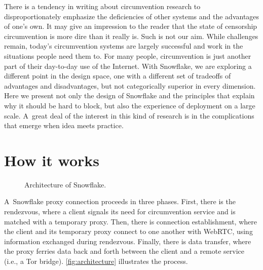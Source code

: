\documentclass[letterpaper,twocolumn]{article}
\begin{document}

There is a tendency in writing about
circumvention research to disproportionately emphasize
the deficiencies of other systems
and the advantages of one's own.
It may give an impression to the reader
that the state of censorship circumvention
is more dire than it really is.
Such is not our aim.
While challenges remain,
today's circumvention systems are largely successful
and work in the situations people need them to.
For many people, circumvention is just another part of their
day-to-day use of the Internet.
With Snowflake, we are exploring a different point in the design space,
one with a different set of tradeoffs of advantages and disadvantages,
but not categorically superior in every dimension.
Here we present not only the design of Snowflake
and the principles that explain why it should be hard to block,
but also the experience of deployment on a large scale.
A~great deal of the interest in this kind of research
is in the complications that emerge when idea meets practice.


\section{How it works}
\label{sec:mechanics}

\begin{figure}
\caption{
Architecture of Snowflake.
}
\label{fig:architecture}
\end{figure}

A~Snowflake proxy connection proceeds in three phases.
First, there is the rendezvous, where a client
signals its need for circumvention service
and is matched with a temporary proxy.
Then, there is connection establishment,
where the client and its temporary proxy connect to one another
with WebRTC, using information exchanged during rendezvous.
Finally, there is data transfer,
where the proxy ferries data back and forth
between the client and a remote service
(i.e., a Tor bridge).
\autoref{fig:architecture}
illustrates the process.
\end{document}
